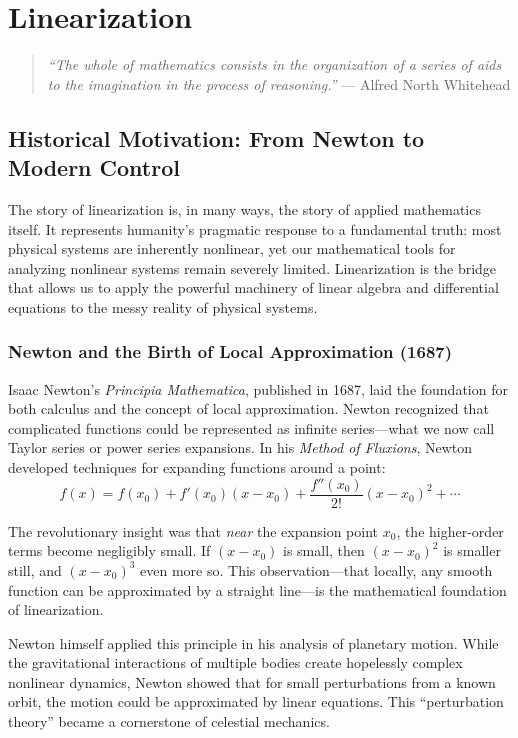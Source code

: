 
\chapter{Linearization}
\label{ch:linearization}

\begin{quote}
\textit{``The whole of mathematics consists in the organization of a series of aids to the imagination in the process of reasoning.''} --- Alfred North Whitehead
\end{quote}

\section{Historical Motivation: From Newton to Modern Control}

The story of linearization is, in many ways, the story of applied mathematics itself. It represents humanity's pragmatic response to a fundamental truth: most physical systems are inherently nonlinear, yet our mathematical tools for analyzing nonlinear systems remain severely limited. Linearization is the bridge that allows us to apply the powerful machinery of linear algebra and differential equations to the messy reality of physical systems.

\subsection{Newton and the Birth of Local Approximation (1687)}

\begin{historicalbox}
Isaac Newton's \textit{Principia Mathematica}, published in 1687, laid the foundation for both calculus and the concept of local approximation. Newton recognized that complicated functions could be represented as infinite series---what we now call Taylor series or power series expansions. In his \textit{Method of Fluxions}, Newton developed techniques for expanding functions around a point:
\begin{equation}
f(x) = f(x_0) + f'(x_0)(x - x_0) + \frac{f''(x_0)}{2!}(x - x_0)^2 + \cdots
\end{equation}

The revolutionary insight was that \textit{near} the expansion point $x_0$, the higher-order terms become negligibly small. If $(x - x_0)$ is small, then $(x - x_0)^2$ is smaller still, and $(x - x_0)^3$ even more so. This observation---that locally, any smooth function can be approximated by a straight line---is the mathematical foundation of linearization.

Newton himself applied this principle in his analysis of planetary motion. While the gravitational interactions of multiple bodies create hopelessly complex nonlinear dynamics, Newton showed that for small perturbations from a known orbit, the motion could be approximated by linear equations. This ``perturbation theory'' became a cornerstone of celestial mechanics.
\end{historicalbox}

